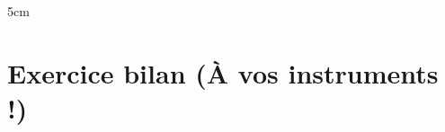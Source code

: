 \documentclass[a4paper]{book}
\begin{document}
\begin{ZoneReponse}{5cm}
\begin{minipage}[t]{0.5\textwidth}
\begin{tikzpicture}[scale=1.2, baseline=(current bounding box.north)]
                
                
                
            \end{tikzpicture}
        \end{minipage}
    \end{ZoneReponse}


    \section{Exercice bilan (À vos instruments !)}
    
\end{document}
